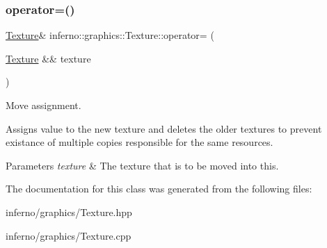 \subsubsection{\texorpdfstring{operator=()}{operator=()}}
{\footnotesize\ttfamily \mbox{\hyperlink{classinferno_1_1graphics_1_1_texture}{Texture}}\& inferno\+::graphics\+::\+Texture\+::operator= (\begin{DoxyParamCaption}\item[{\mbox{\hyperlink{classinferno_1_1graphics_1_1_texture}{Texture}} \&\&}]{texture }\end{DoxyParamCaption})\hspace{0.3cm}{\ttfamily [inline]}}



Move assignment. 

Assigns value to the new texture and deletes the older textures to prevent existance of multiple copies responsible for the same resources. 
\begin{DoxyParams}{Parameters}
{\em texture} & The texture that is to be moved into this. \\
\hline
\end{DoxyParams}


The documentation for this class was generated from the following files\+:\begin{DoxyCompactItemize}
\item 
inferno/graphics/Texture.\+hpp\item 
inferno/graphics/Texture.\+cpp\end{DoxyCompactItemize}
